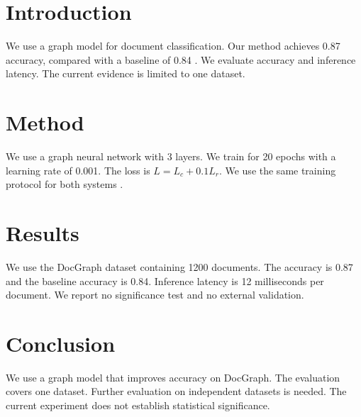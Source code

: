 \section{Introduction}
We use a graph model for document classification. Our method achieves 0.87 accuracy, compared with a baseline of 0.84 \cite{smith2020}. We evaluate accuracy and inference latency. The current evidence is limited to one dataset.

\section{Method}
We use a graph neural network with 3 layers. We train for 20 epochs with a learning rate of 0.001. The loss is $L = L_c + 0.1 L_r$. We use the same training protocol for both systems \cite{lee2021}.

\section{Results}
We use the DocGraph dataset containing 1200 documents. The accuracy is 0.87 and the baseline accuracy is 0.84. Inference latency is 12 milliseconds per document. We report no significance test and no external validation.

\section{Conclusion}
We use a graph model that improves accuracy on DocGraph. The evaluation covers one dataset. Further evaluation on independent datasets is needed. The current experiment does not establish statistical significance.
